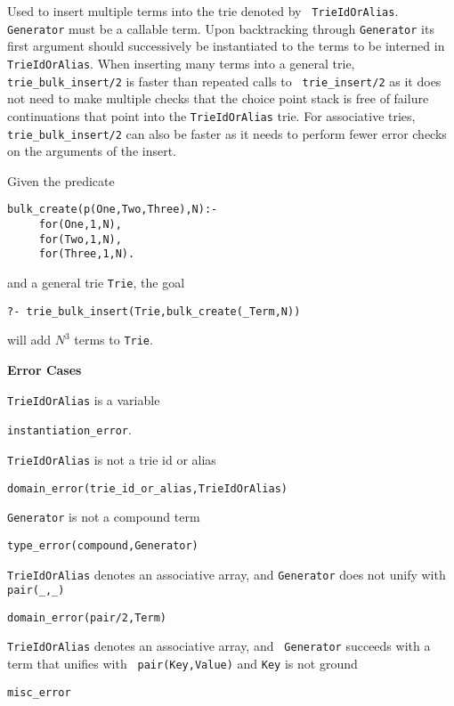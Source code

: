 \begin{description}
% 
Used to insert multiple terms into the trie denoted by {\tt
  TrieIdOrAlias}.  {\tt Generator} must be a callable term.  Upon
backtracking through {\tt Generator} its first argument should
successively be instantiated to the terms to be interned in {\tt
  TrieIdOrAlias}.  When inserting many terms into a general trie, {\tt
  trie\_bulk\_insert/2} is faster than repeated calls to {\tt
  trie\_insert/2} as it does not need to make multiple checks that the
choice point stack is free of failure continuations that point into
the {\tt TrieIdOrAlias} trie.  For associative tries, {\tt
  trie\_bulk\_insert/2} can also be faster as it needs to perform
fewer error checks on the arguments of the insert.

\begin{example} \rm
Given the predicate 
\begin{verbatim}
bulk_create(p(One,Two,Three),N):- 
     for(One,1,N),
     for(Two,1,N),
     for(Three,1,N).
\end{verbatim}
and a general trie {\tt Trie}, the goal 
\begin{center}
   {\tt ?- trie\_bulk\_insert(Trie,bulk\_create(\_Term,N))} 
\end{center}
will add $N^3$ terms to {\tt Trie}.
\end{example}

{\bf Error Cases}
\bi
\item 	{\tt TrieIdOrAlias} is a variable
\bi
\item 	{\tt instantiation\_error}.
\ei
\item 	{\tt TrieIdOrAlias} is not a trie id or alias
\bi
\item 	{\tt domain\_error(trie\_id\_or\_alias,TrieIdOrAlias)}
\ei
\item   {\tt Generator} is not a compound term
\bi
\item   {\tt type\_error(compound,Generator)}
\ei
\item 	{\tt TrieIdOrAlias} denotes an associative array, and {\tt Generator} 
  does not unify with {\tt pair(\_,\_)} 
\bi
\item 	{\tt domain\_error(pair/2,Term)}
\ei
\item {\tt TrieIdOrAlias} denotes an associative array, and {\tt
  Generator} succeeds with a term that unifies with {\tt
  pair(Key,Value)} and {\tt Key} is not ground 
\bi
\item 	{\tt misc\_error}
\ei
\ei


\end{description}
